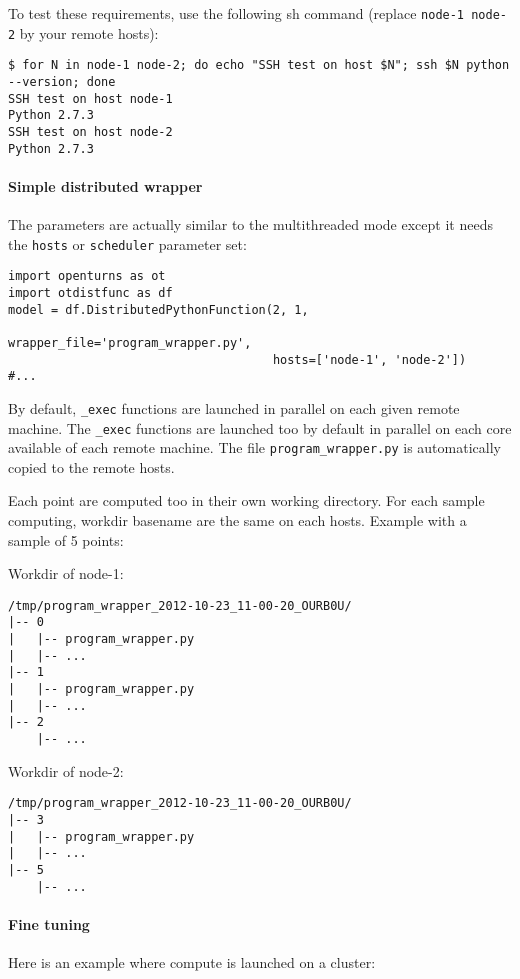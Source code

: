 To test these requirements, use the following sh command (replace \verb|node-1 node-2| by your remote hosts):
\begin{lstlisting}
$ for N in node-1 node-2; do echo "SSH test on host $N"; ssh $N python --version; done
SSH test on host node-1
Python 2.7.3
SSH test on host node-2
Python 2.7.3
\end{lstlisting}

\paragraph{Simple distributed wrapper}

The parameters are actually similar to the multithreaded mode except it needs the \verb|hosts| or \verb|scheduler| parameter set:

\begin{lstlisting}
import openturns as ot
import otdistfunc as df
model = df.DistributedPythonFunction(2, 1, 
                                     wrapper_file='program_wrapper.py',
                                     hosts=['node-1', 'node-2'])
#...
\end{lstlisting}

By default, \verb|_exec| functions are launched in parallel on each given remote machine. The \verb|_exec| functions are launched too by default in parallel on each core available of each remote machine.
The file \verb|program_wrapper.py| is automatically copied to the remote hosts.

Each point are computed too in their own working directory.
For each sample computing, workdir basename are the same on each hosts. Example with a sample of 5 points:

Workdir of node-1:
\begin{lstlisting}
/tmp/program_wrapper_2012-10-23_11-00-20_OURB0U/
|-- 0
|   |-- program_wrapper.py
|   |-- ...
|-- 1
|   |-- program_wrapper.py
|   |-- ...
|-- 2
    |-- ...
\end{lstlisting}

Workdir of node-2:
\begin{lstlisting}
/tmp/program_wrapper_2012-10-23_11-00-20_OURB0U/
|-- 3
|   |-- program_wrapper.py
|   |-- ...
|-- 5
    |-- ...
\end{lstlisting}



\paragraph{Fine tuning} Here is an example where compute is launched on a cluster: 

